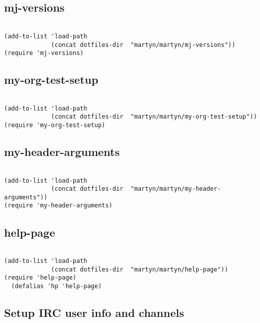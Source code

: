 \documentclass[colorlinks=true,urlcolor=blue,listings-sv]{article}
\begin{document}
\subsection{mj-versions}
\label{sec-1-47}



\lstset{language=Lisp}
\begin{lstlisting}

(add-to-list 'load-path
             (concat dotfiles-dir  "martyn/martyn/mj-versions"))
(require 'mj-versions)
\end{lstlisting}
\subsection{my-org-test-setup}
\label{sec-1-48}



\lstset{language=Lisp}
\begin{lstlisting}

(add-to-list 'load-path
             (concat dotfiles-dir  "martyn/martyn/my-org-test-setup"))
(require 'my-org-test-setup)
\end{lstlisting}
\subsection{my-header-arguments}
\label{sec-1-49}



\lstset{language=Lisp}
\begin{lstlisting}

(add-to-list 'load-path
             (concat dotfiles-dir  "martyn/martyn/my-header-arguments"))
(require 'my-header-arguments)
\end{lstlisting}
\subsection{help-page}
\label{sec-1-50}



\lstset{language=Lisp}
\begin{lstlisting}

(add-to-list 'load-path
             (concat dotfiles-dir  "martyn/martyn/help-page"))
(require 'help-page)
  (defalias 'hp 'help-page)
\end{lstlisting}
\subsection{Setup IRC user info and channels}
\label{sec-1-51}
\end{document}
